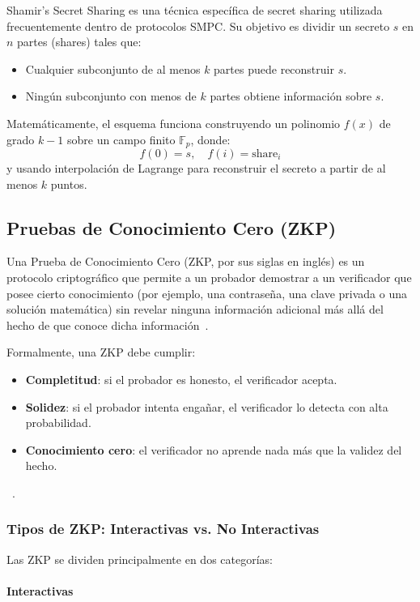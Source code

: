 \documentclass{article}
\begin{document}
Shamir’s Secret Sharing es una técnica específica de secret sharing utilizada frecuentemente dentro de protocolos SMPC. Su objetivo es dividir un secreto \( s \) en \( n \) partes (shares) tales que:
\begin{itemize}
    \item Cualquier subconjunto de al menos \( k \) partes puede reconstruir \( s \).
    \item Ningún subconjunto con menos de \( k \) partes obtiene información sobre \( s \).
\end{itemize}

Matemáticamente, el esquema funciona construyendo un polinomio \( f(x) \) de grado \( k-1 \) sobre un campo finito \( \mathbb{F}_p \), donde:
\[
f(0) = s, \quad f(i) = \text{share}_i
\]
y usando interpolación de Lagrange para reconstruir el secreto a partir de al menos \( k \) puntos.
\subsection{Pruebas de Conocimiento Cero (ZKP)}

Una Prueba de Conocimiento Cero (ZKP, por sus siglas en inglés) es un protocolo criptográfico que permite a un probador demostrar a un verificador que posee cierto conocimiento (por ejemplo, una contraseña, una clave privada o una solución matemática) sin revelar ninguna información adicional más allá del hecho de que conoce dicha información~\cite{goldreich2001}.

Formalmente, una ZKP debe cumplir:
\begin{itemize}
    \item \textbf{Completitud}: si el probador es honesto, el verificador acepta.
    \item \textbf{Solidez}: si el probador intenta engañar, el verificador lo detecta con alta probabilidad.
    \item \textbf{Conocimiento cero}: el verificador no aprende nada más que la validez del hecho.
\end{itemize}~\cite{goldreich2001}.

\subsubsection{Tipos de ZKP: Interactivas vs. No Interactivas}

Las ZKP se dividen principalmente en dos categorías:

\paragraph{Interactivas}
\end{document}
